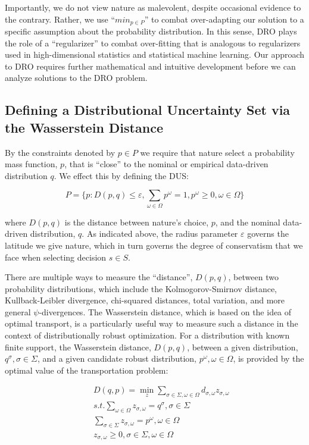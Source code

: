 Importantly, we do not view nature as malevolent, despite occasional evidence to the contrary.
Rather, we use ``$min_{p\in P}$'' to combat over-adapting our solution to a specific assumption
about the probability distribution. In this sense, DRO plays the role of a ``regularizer'' to
combat over-fitting that is analogous to regularizers used in high-dimensional statistics
and statistical machine learning. Our approach to DRO requires further mathematical and
intuitive development before we can analyze solutions to the DRO problem.

\subsection{Defining a Distributional Uncertainty Set via the Wasserstein Distance}
\label{WassersteinDistance}
By the constraints denoted by $p\in P$ we require that nature select a probability
mass function, $p$, that is ``close'' to the nominal or empirical data-driven distribution
$q$. We effect this by defining the DUS:

\begin{equation}
P=\{p: D(p,q)\le \varepsilon, \sum_{\omega\in \Omega} p^\omega = 1, p^\omega \ge 0, \omega \in \Omega \}
\end{equation}

where $D(p, q)$ is the distance between nature’s choice, $p$, and the nominal data-driven distribution,
$q$. As indicated above, the radius parameter $\varepsilon$ governs the latitude we give nature,
which in turn governs the degree of conservatism that we face when selecting decision $s\in S$.

There are multiple ways to measure the ``distance'', $D(p, q)$, between two probability distributions,
which include the Kolmogorov-Smirnov distance, Kullback-Leibler divergence, chi-squared distances,
total variation, and more general $\psi$-divergences. The Wasserstein distance, which is based on
the idea of optimal transport, is a particularly useful way to measure such a distance in the
context of distributionally robust optimization. For a distribution with known finite support,
the Wasserstein distance, $D(p, q)$, between a given distribution, $q^\sigma, \sigma \in \Sigma$,
and a given candidate robust distribution, $p^\omega, \omega \in \Omega$, is provided by the
optimal value of the transportation problem:

\begin{subequations}\label{WassersteinEq}
\begin{eqnarray}
& & D(q, p) = \min_{z} \sum_{\sigma \in \Sigma, \omega \in \Omega} d_{\sigma, \omega} z_{\sigma, \omega} \\
& & s.t. \sum_{\omega \in \Omega} z_{\sigma, \omega} = q^\sigma, \sigma \in \Sigma \\
& & \sum_{\sigma \in \Sigma} z_{\sigma, \omega} = p^\omega, \omega \in \Omega \\
& & z_{\sigma, \omega} \ge 0, \sigma \in \Sigma, \omega \in \Omega
\end{eqnarray}
\end{subequations}

